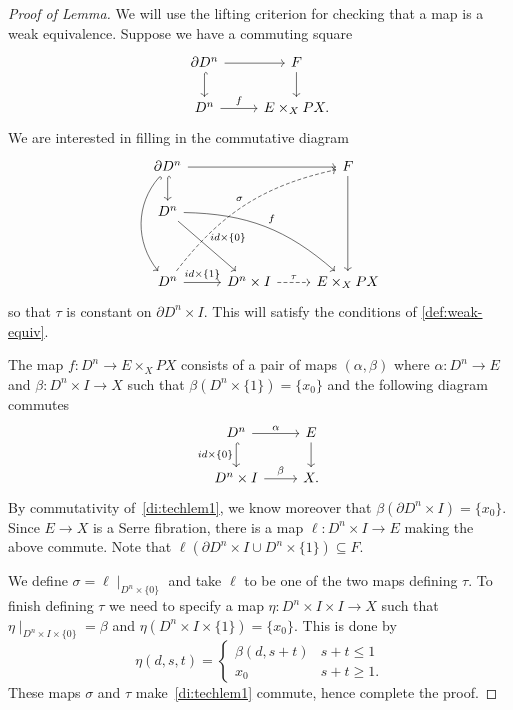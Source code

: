\documentclass{article}
\newtheorem{proposed work}[theorem]{Proposed Work}
\begin{document}
\begin{proof}[Proof of Lemma]
We will use the lifting criterion for checking that a map is a weak
equivalence. Suppose we have a commuting square
\[
\begin{tikzcd}
\partial D^n \arrow[r] \arrow[hookrightarrow]{d} & F \arrow[d] \\
D^n \arrow[r,"f"] & E \times_X PX.
\end{tikzcd}
\]
We are interested in filling in the commutative diagram
\begin{equation}\label{di:techlem1}
\begin{tikzcd}
  \partial D^n \arrow[rr] \arrow[hookrightarrow]{d}
  \arrow[hookrightarrow, bend right=40]{ddd} 
  & 
  & F \arrow[ddd] \\
  D^n \arrow[ddrr,bend left=20,"f"] \arrow["id\times\{0\}"]{ddr} 
  &
  & \\
  &
  & \\
  D^n \arrow["id\times\{1\}"]{r} \arrow[dashed, bend left=20,"\sigma"]{uuurr}
  &D^n\times I \arrow[dashed,"\tau"]{r} 
  & E \times_X PX
\end{tikzcd}
\end{equation}
so that $\tau$ is constant on $\partial D^n \times I$. This will
satisfy the conditions of \ref{def:weak-equiv}.

The map $f: D^n\to E\times_X PX$ consists of a pair of maps
$(\alpha, \beta)$ where $\alpha : D^n\to E$ and
$\beta: D^n\times I \to X$ such that
$\beta( D^n \times \{1\}) = \{x_0\}$ and the following diagram
commutes
\[
\begin{tikzcd}
D^n \arrow[r,"\alpha"] \arrow[hookrightarrow,swap,"id\times \{0\}"]{d} 
& E \arrow[d] 
\\
D^n\times I \arrow[r,"\beta"] 
& X.
\end{tikzcd}
\]
By commutativity of~\eqref{di:techlem1}, we know moreover that
$\beta( \partial D^n \times I ) = \{x_0\}$. Since $E\to X$ is a Serre
fibration, there is a map $\ell : D^n\times I \to E$ making the above
commute. Note that $\ell( \partial D^n\times I \cup D^n\times \{1\})
\subseteq F$.

We define $\sigma = \ell\mid_{D^n\times \{0\}}$ and take $\ell$ to be
one of the two maps defining $\tau$. To finish defining $\tau$ we need
to specify a map $\eta: D^n\times I \times I \to X$ such that
$\eta\mid_{D^n\times I \times \{0\}} = \beta$ and $\eta( D^n\times I
\times \{1\}) = \{x_0\}$. This is done by 
\[
\eta(d, s, t) =  
\begin{cases}
\beta(d,s+t) & s+t\leq 1
\\ x_0 & s+t\geq 1.
\end{cases}
\]
These maps $\sigma$ and $\tau$ make~\eqref{di:techlem1} commute, hence
complete the proof.
\end{proof}
\end{document}
